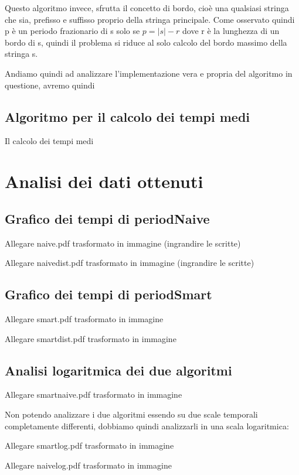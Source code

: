\documentclass[a4paper]{article}
\begin{document}
Questo algoritmo invece, sfrutta il concetto di bordo, cioè una qualsiasi stringa che sia, prefisso e suffisso proprio della stringa principale. Come osservato quindi p è un periodo frazionario di s solo se \(p = |s| - r\) dove r è la lunghezza di un bordo di s, quindi il problema si riduce al solo calcolo del bordo massimo della stringa s.

Andiamo quindi ad analizzare l’implementazione vera e propria del algoritmo in questione, avremo quindi

\subsection{Algoritmo per il calcolo dei tempi medi}

Il calcolo dei tempi medi

\section{Analisi dei dati ottenuti}

\subsection{Grafico dei tempi di periodNaive}

Allegare naive.pdf trasformato in immagine (ingrandire le scritte)

Allegare naivedist.pdf trasformato in immagine (ingrandire le scritte)

\subsection{Grafico dei tempi di periodSmart}

Allegare smart.pdf trasformato in immagine

Allegare smartdist.pdf trasformato in immagine

\subsection{Analisi logaritmica dei due algoritmi}

Allegare smartnaive.pdf trasformato in immagine

Non potendo analizzare i due algoritmi essendo su due scale temporali completamente differenti, dobbiamo quindi analizzarli in una scala logaritmica:

Allegare smartlog.pdf trasformato in immagine

Allegare naivelog.pdf trasformato in immagine
\end{document}
